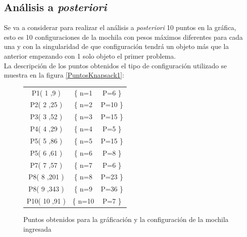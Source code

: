  \newpage
    
    \subsection*{Análisis a \textit{posteriori}}
        
        Se va a considerar para realizar el análisis a \textit{posteriori} 10 puntos en la gráfica, esto es 10 configuraciones de la mochila con pesos máximos diferentes para cada una y con la singularidad de que configuración tendrá un objeto más que la anterior empezando con 1 solo objeto el primer problema.\\
        
        La descripción de los puntos obtenidos el tipo de configuración utilizado se muestra en la figura \ref{PuntosKnapsack1}:
        \begin{figure}[h!]
            \centering
            \begin{tabular}{c c c}
                P1( 1 ,9 ) & \{ n=1 & P=6 \} \\
                P2( 2 ,25 ) & \{ n=2 & P=10 \} \\
                P3( 3 ,52 ) & \{ n=3 & P=15 \} \\
                P4( 4 ,29 ) & \{ n=4 & P=5 \} \\
                P5( 5 ,86 ) & \{ n=5 & P=15 \} \\
                P5( 6 ,61 ) & \{ n=6 & P=8 \} \\
                P7( 7 ,57 ) & \{ n=7 & P=6 \} \\
                P8( 8 ,201 ) & \{ n=8 & P=23 \} \\
                P8( 9 ,343 ) & \{ n=9 & P=36 \} \\
                P10( 10 ,91 ) & \{ n=10 & P=7 \} \\
            \end{tabular}
            \caption{Puntos obtenidos para la gráficación y la configuración de la mochila ingresada}
            \label{fig:my_label}
        \end{figure}
        
